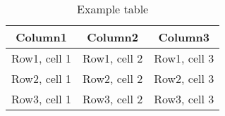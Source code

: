 \documentclass{article}
\begin{document}
	\begin{table}
	\centering 
	\begin{tabular}{|c|c|c|}
		\hline
		\textbf{Column1} &
		\textbf{Column2} &
		\textbf{Column3} \\
		\hline
		Row1, cell 1 & Row1, cell 2 & Row1, cell 3\\
		Row2, cell 1 & Row2, cell 2 & Row2, cell 3\\
		Row3, cell 1 & Row3, cell 2 & Row3, cell 3\\
		\hline
	\end{tabular}
	\caption{Example table}
	\label{tab:example}
\end{table}
\end{document}

